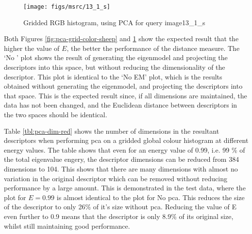 \begin{appendices}
\begin{figure}[ht]
	\begin{minipage}[]{0.3\linewidth}
		\centering
		\texttt{[image: figs/msrc/13\_1\_s]}
	\end{minipage}
	\begin{minipage}[]{0.7\linewidth}
		\centering
		\prplotclose
	\end{minipage}
	\caption{Gridded RGB histogram, using PCA for query image13\_1\_s}
	\label{fig:pca-grid-color-books}
\end{figure}

Both Figures \ref{fig:pca-grid-color-sheep} and \ref{fig:pca-grid-color-books} show the expected result that the higher the value of $E$, the better the performance of the distance measure. The `No ' plot shows the result of generating the eigenmodel and projecting the descriptors into this space, but without reducing the dimensionality of the descriptor. This plot is identical to the `No EM' plot, which is the results obtained without generating the eigenmodel, and projecting the descriptors into that space. This is the expected result since, if all dimensions are maintained, the data has not been changed, and the Euclidean distance between descriptors in the two spaces should be identical.

Table \ref{tbl:pca-dim-red} shows the number of dimensions in the resultant descriptors when performing \gls{pca} on a gridded global colour histogram at different energy values. The table shows that even for an energy value of 0.99, i.e. 99 \% of the total eigenvalue engery, the descriptor dimensions can be reduced from 384 dimensions to 104. This shows that there are many dimensions with almost no variation in the original descriptor which can be removed without reducing performance by a large amount. This is demonstrated in the test data, where the plot for $E=0.99$ is almost identical to the plot for No \gls{pca}. This reduces the size of the descriptor to only 26\% of it's size without \gls{pca}. Reducing the value of E even further to 0.9 means that the descriptor is only 8.9\% of its original size, whilst still maintaining good performance.


\end{appendices}
